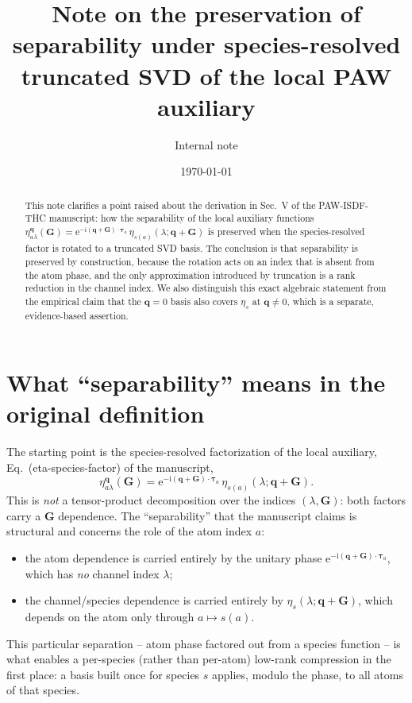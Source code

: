 \documentclass[aps,prb,reprint,superscriptaddress,nofootinbib]{revtex4-2}
\newcommand{\bG}{\mathbf G}
\newcommand{\bq}{\mathbf q}
\newcommand{\btau}{\boldsymbol\tau}
\newcommand{\ee}{\mathrm e}
\newcommand{\ii}{\mathrm i}
\begin{document}
\title{Note on the preservation of separability under
species-resolved truncated SVD of the local PAW auxiliary}

\author{Internal note}
\date{\today}

\begin{abstract}
This note clarifies a point raised about the derivation in Sec.~V of the
PAW-ISDF-THC manuscript: how the separability of the local auxiliary
functions
\(\eta_{a\lambda}^{\bq}(\bG)
=\ee^{-\ii(\bq+\bG)\cdot\btau_a}\,\eta_{s(a)}(\lambda;\bq+\bG)\)
is preserved when the species-resolved factor is rotated to a truncated
SVD basis.  The conclusion is that separability is preserved by
construction, because the rotation acts on an index that is absent from
the atom phase, and the only approximation introduced by truncation is a
rank reduction in the channel index.  We also distinguish this exact
algebraic statement from the empirical claim that the \(\bq=0\) basis
also covers \(\eta_s\) at \(\bq\neq 0\), which is a separate, evidence-based
assertion.
\end{abstract}

\maketitle

\section{What ``separability'' means in the original definition}

The starting point is the species-resolved factorization of the local
auxiliary, Eq.~(eta-species-factor) of the manuscript,
\begin{equation}
\eta_{a\lambda}^{\bq}(\bG)
=\ee^{-\ii(\bq+\bG)\cdot\btau_a}\,
\eta_{s(a)}(\lambda;\bq+\bG).
\label{eq:def}
\end{equation}
This is \emph{not} a tensor-product decomposition over the indices
\((\lambda,\bG)\): both factors carry a \(\bG\) dependence.  The
``separability'' that the manuscript claims is structural and concerns
the role of the atom index \(a\):
\begin{itemize}
\item the atom dependence is carried entirely by the unitary phase
\(\ee^{-\ii(\bq+\bG)\cdot\btau_a}\), which has \emph{no} channel index
\(\lambda\);
\item the channel/species dependence is carried entirely by
\(\eta_s(\lambda;\bq+\bG)\), which depends on the atom only through
\(a\!\mapsto\!s(a)\).
\end{itemize}
This particular separation -- atom phase factored out from a species
function -- is what enables a per-species (rather than per-atom) low-rank
compression in the first place: a basis built once for species \(s\)
applies, modulo the phase, to all atoms of that species.
\end{document}

